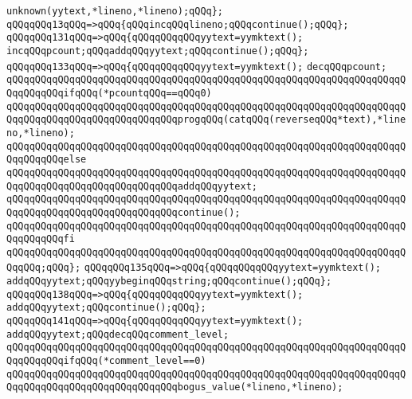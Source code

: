 \verb|unknown(yytext,*lineno,*lineno);qQQq};|\newline
\verb|qQQqqQQq13qQQq=>qQQq{qQQqincqQQqlineno;qQQqcontinue();qQQq};|\newline
\verb|qQQqqQQq131qQQq=>qQQq{qQQqqQQqqQQqyytext=yymktext();|\newline
\verb|incqQQqpcount;qQQqaddqQQqyytext;qQQqcontinue();qQQq};|\newline
\verb|qQQqqQQq133qQQq=>qQQq{qQQqqQQqqQQqyytext=yymktext();|\newline
\verb|decqQQqpcount;|\newline
\verb|qQQqqQQqqQQqqQQqqQQqqQQqqQQqqQQqqQQqqQQqqQQqqQQqqQQqqQQqqQQqqQQqqQQqqQQqqQQqqQQqifqQQq(*pcountqQQq==qQQq0)|\newline
\verb|qQQqqQQqqQQqqQQqqQQqqQQqqQQqqQQqqQQqqQQqqQQqqQQqqQQqqQQqqQQqqQQqqQQqqQQqqQQqqQQqqQQqqQQqqQQqqQQqqQQqprogqQQq(catqQQq(reverseqQQq*text),*lineno,*lineno);|\newline
\verb|qQQqqQQqqQQqqQQqqQQqqQQqqQQqqQQqqQQqqQQqqQQqqQQqqQQqqQQqqQQqqQQqqQQqqQQqqQQqqQQqelse|\newline
\verb|qQQqqQQqqQQqqQQqqQQqqQQqqQQqqQQqqQQqqQQqqQQqqQQqqQQqqQQqqQQqqQQqqQQqqQQqqQQqqQQqqQQqqQQqqQQqqQQqqQQqaddqQQqyytext;|\newline
\verb|qQQqqQQqqQQqqQQqqQQqqQQqqQQqqQQqqQQqqQQqqQQqqQQqqQQqqQQqqQQqqQQqqQQqqQQqqQQqqQQqqQQqqQQqqQQqqQQqqQQqcontinue();|\newline
\verb|qQQqqQQqqQQqqQQqqQQqqQQqqQQqqQQqqQQqqQQqqQQqqQQqqQQqqQQqqQQqqQQqqQQqqQQqqQQqqQQqfi|\newline
\verb|qQQqqQQqqQQqqQQqqQQqqQQqqQQqqQQqqQQqqQQqqQQqqQQqqQQqqQQqqQQqqQQqqQQqqQQqqQQq;qQQq};|\newline
\verb|qQQqqQQq135qQQq=>qQQq{qQQqqQQqqQQqyytext=yymktext();|\newline
\verb|addqQQqyytext;qQQqyybeginqQQqstring;qQQqcontinue();qQQq};|\newline
\verb|qQQqqQQq138qQQq=>qQQq{qQQqqQQqqQQqyytext=yymktext();|\newline
\verb|addqQQqyytext;qQQqcontinue();qQQq};|\newline
\verb|qQQqqQQq141qQQq=>qQQq{qQQqqQQqqQQqyytext=yymktext();|\newline
\verb|addqQQqyytext;qQQqdecqQQqcomment_level;|\newline
\verb|qQQqqQQqqQQqqQQqqQQqqQQqqQQqqQQqqQQqqQQqqQQqqQQqqQQqqQQqqQQqqQQqqQQqqQQqqQQqqQQqifqQQq(*comment_level==0)|\newline
\verb|qQQqqQQqqQQqqQQqqQQqqQQqqQQqqQQqqQQqqQQqqQQqqQQqqQQqqQQqqQQqqQQqqQQqqQQqqQQqqQQqqQQqqQQqqQQqqQQqqQQqbogus_value(*lineno,*lineno);|\newline
